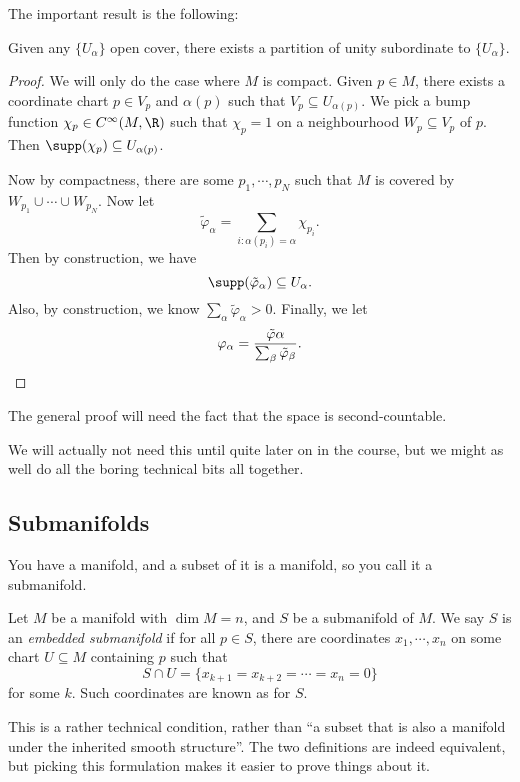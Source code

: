 \documentclass[a4paper]{article}
\begin{document}
The important result is the following:
\begin{thm}
  Given any $\{U_\alpha\}$ open cover, there exists a partition of unity subordinate to $\{U_\alpha\}$.
\end{thm}

\begin{proof}
  We will only do the case where $M$ is compact. Given $p \in M$, there exists a coordinate chart $p \in V_p$ and $\alpha(p)$ such that $V_p \subseteq U_{\alpha(p)}$. We pick a bump function $\chi_p \in C^\infty(M, \R)$ such that $\chi_p = 1$ on a neighbourhood $W_p \subseteq V_p$ of $p$. Then $\supp(\chi_p) \subseteq U_{\alpha(p)}$.

  Now by compactness, there are some $p_1, \cdots, p_N$ such that $M$ is covered by $W_{p_1} \cup \cdots \cup W_{p_N}$. Now let
  \[
    \tilde{\varphi}_\alpha = \sum_{i: \alpha(p_i) = \alpha} \chi_{p_i}.
  \]
  Then by construction, we have
  \[
    \supp(\tilde{\varphi}_\alpha) \subseteq U_\alpha.
  \]
  Also, by construction, we know $\sum_\alpha \tilde{\varphi}_\alpha > 0$. Finally, we let
  \[
    \varphi_\alpha = \frac{\tilde{\varphi}\alpha}{\sum_\beta \tilde{\varphi}_\beta}. \qedhere
  \]
\end{proof}
The general proof will need the fact that the space is second-countable.

We will actually not need this until quite later on in the course, but we might as well do all the boring technical bits all together.

\subsection{Submanifolds}
You have a manifold, and a subset of it is a manifold, so you call it a submanifold.

\begin{defi}
  Let $M$ be a manifold with $\dim M = n$, and $S$ be a submanifold of $M$. We say $S$ is an \emph{embedded submanifold} if for all $p \in S$, there are coordinates $x_1, \cdots, x_n$ on some chart $U \subseteq M$ containing $p$ such that
  \[
    S \cap U = \{x_{k + 1} = x_{k + 2} = \cdots = x_n = 0\}
  \]
  for some $k$. Such coordinates are known as  for $S$.
\end{defi}
This is a rather technical condition, rather than ``a subset that is also a manifold under the inherited smooth structure''. The two definitions are indeed equivalent, but picking this formulation makes it easier to prove things about it.
\end{document}
